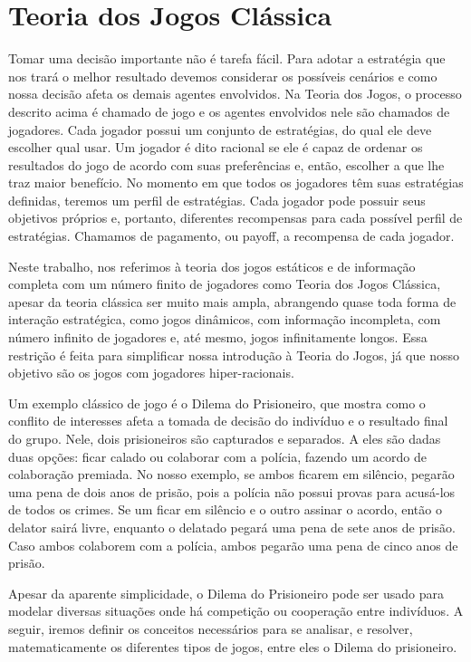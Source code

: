 \chapter{Teoria dos Jogos Clássica}

Tomar uma decisão importante não é tarefa fácil. Para adotar a estratégia que nos trará o melhor resultado devemos considerar os possíveis cenários e como nossa decisão afeta os demais agentes envolvidos. Na Teoria dos Jogos, o processo descrito acima é chamado de jogo e os agentes envolvidos nele são chamados de jogadores. Cada jogador possui um conjunto de estratégias, do qual ele deve escolher qual usar. Um jogador é dito racional se ele é capaz de ordenar os resultados do jogo de acordo com suas preferências e, então, escolher a que lhe traz maior benefício. No momento em que todos os jogadores têm suas estratégias definidas, teremos um perfil de estratégias. Cada jogador pode possuir seus objetivos próprios e, portanto, diferentes recompensas para cada possível perfil de estratégias. Chamamos de pagamento, ou payoff, a recompensa de cada jogador.

Neste trabalho, nos referimos à teoria dos jogos estáticos e de informação completa com um número finito de jogadores como Teoria dos Jogos Clássica, apesar da teoria clássica ser muito mais ampla, abrangendo quase toda forma de interação estratégica, como jogos dinâmicos, com informação incompleta, com número infinito de jogadores e, até mesmo, jogos infinitamente longos. Essa restrição é feita para simplificar nossa introdução à Teoria do Jogos, já que nosso objetivo são os jogos com jogadores hiper-racionais.

Um exemplo clássico de jogo é o Dilema do Prisioneiro, que mostra como o conflito de interesses afeta a tomada de decisão do indivíduo e o resultado final do grupo. Nele, dois prisioneiros são capturados e separados. A eles são dadas duas opções: ficar calado ou colaborar com a polícia, fazendo um acordo de colaboração premiada. No nosso exemplo, se ambos ficarem em silêncio, pegarão uma pena de dois anos de prisão, pois a polícia não possui provas para acusá-los de todos os crimes. Se um ficar em silêncio e o outro assinar o acordo, então o delator sairá livre, enquanto o delatado pegará uma pena de sete anos de prisão. Caso ambos colaborem com a polícia, ambos pegarão uma pena de cinco anos de prisão.

Apesar da aparente simplicidade, o Dilema do Prisioneiro pode ser usado para modelar diversas situações onde há competição ou cooperação entre indivíduos. A seguir, iremos definir os conceitos necessários para se analisar, e resolver, matematicamente os diferentes tipos de jogos, entre eles o Dilema do prisioneiro.

